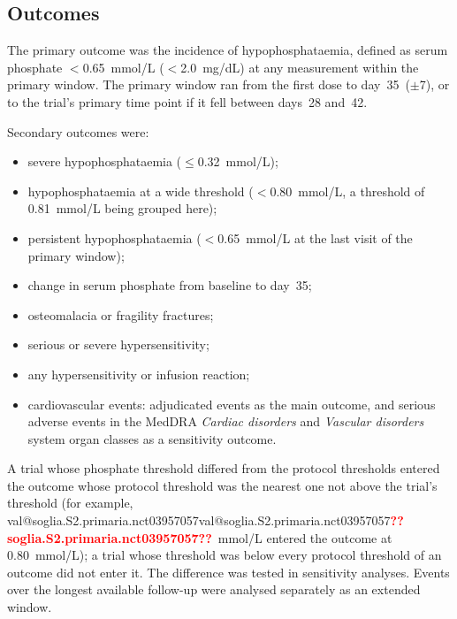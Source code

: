 \documentclass[11pt,a4paper]{article}
\makeatletter
\newcommand{\val}[1]{\ifcsname val@#1\endcsname\csname val@#1\endcsname\else\textbf{\textcolor{red}{??#1??}}\fi}
\makeatother
\begin{document}
\subsection{Outcomes}
The primary outcome was the incidence of hypophosphataemia, defined as serum phosphate $<$0.65~mmol/L ($<$2.0~mg/dL) at any measurement within the primary window. The primary window ran from the first dose to day~35~($\pm$7), or to the trial's primary time point if it fell between days~28 and~42.

Secondary outcomes were:
\begin{itemize}
\item severe hypophosphataemia ($\le$0.32~mmol/L);
\item hypophosphataemia at a wide threshold ($<$0.80~mmol/L, a threshold of 0.81~mmol/L being grouped here);
\item persistent hypophosphataemia ($<$0.65~mmol/L at the last visit of the primary window);
\item change in serum phosphate from baseline to day~35;
\item osteomalacia or fragility fractures;
\item serious or severe hypersensitivity;
\item any hypersensitivity or infusion reaction;
\item cardiovascular events: adjudicated events as the main outcome, and serious adverse events in the MedDRA \emph{Cardiac disorders} and \emph{Vascular disorders} system organ classes as a sensitivity outcome.
\end{itemize}
A trial whose phosphate threshold differed from the protocol thresholds entered the outcome whose protocol threshold was the nearest one not above the trial's threshold (for example, \val{soglia.S2.primaria.nct03957057}~mmol/L entered the outcome at 0.80~mmol/L); a trial whose threshold was below every protocol threshold of an outcome did not enter it. The difference was tested in sensitivity analyses. Events over the longest available follow-up were analysed separately as an extended window.
\end{document}
